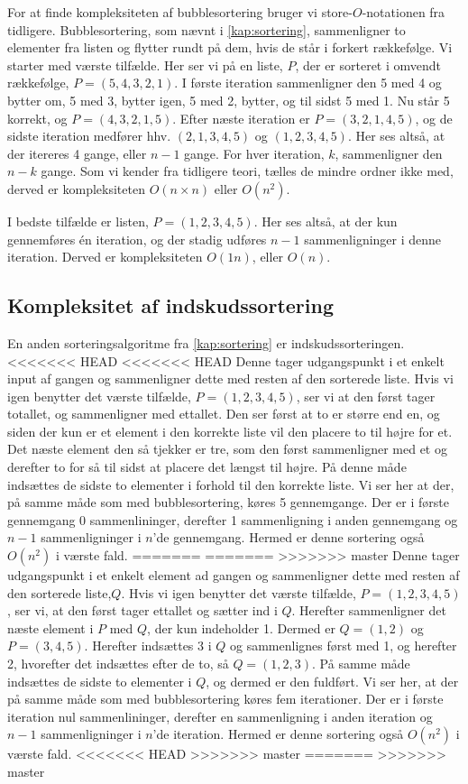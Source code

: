For at finde kompleksiteten af bubblesortering bruger vi store-$O$-notationen fra tidligere. 
Bubblesortering, som nævnt i \autoref{kap:sortering}, sammenligner to elementer fra listen og flytter rundt på dem, hvis de står i forkert rækkefølge.
Vi starter med værste tilfælde. Her ser vi på en liste, $P$, der er sorteret i omvendt rækkefølge, $P = (5,4,3,2,1)$.
I første iteration sammenligner den 5 med 4 og bytter om, 5 med 3, bytter igen, 5 med 2, bytter, og til sidst 5 med 1. Nu står 5 korrekt, og $P = (4, 3, 2, 1, 5)$.
Efter næste iteration er $P = (3, 2, 1, 4, 5)$, og de sidste iteration medfører hhv. $(2, 1, 3, 4, 5)$ og $(1, 2, 3, 4, 5)$. Her ses altså, at der itereres 4 gange, eller $n-1$ gange. 
For hver iteration, $k$, sammenligner den $n-k$ gange. 
Som vi kender fra tidligere teori, tælles de mindre ordner ikke med, derved er kompleksiteten $O(n\times n)$ eller $O(n^2)$.

I bedste tilfælde er listen, $P = (1, 2, 3, 4, 5)$.
Her ses altså, at der kun gennemføres én iteration, og der stadig udføres $n-1$ sammenligninger i denne iteration. Derved er kompleksiteten $O(1n)$, eller $O(n)$. 

\subsection{Kompleksitet af indskudssortering} \label{kap:kom_indskud}
En anden sorteringsalgoritme fra \autoref{kap:sortering} er indskudssorteringen. 
<<<<<<< HEAD
<<<<<<< HEAD
Denne tager udgangspunkt i et enkelt input af gangen og sammenligner dette med resten af den sorterede liste.
Hvis vi igen benytter det værste tilfælde, $P = (1,2,3,4,5)$, ser vi at den først tager totallet, og sammenligner med ettallet. Den ser først at to er større end en, og siden der kun er et element i den korrekte liste vil den placere to til højre for et. Det næste element den så tjekker er tre, som den først sammenligner med et og derefter to for så til sidst at placere det længst til højre. På denne måde indsættes de sidste to elementer i forhold til den korrekte liste.
Vi ser her at der, på samme måde som med bubblesortering, køres 5 gennemgange. Der er i første gennemgang 0 sammenlininger, derefter 1 sammenligning i anden gennemgang og $n-1$ sammenligninger i $n$'de gennemgang. Hermed er denne sortering også $O(n^2)$ i værste fald.
=======
=======
>>>>>>> master
Denne tager udgangspunkt i et enkelt element ad gangen og sammenligner dette med resten af den sorterede liste,$Q$.
Hvis vi igen benytter det værste tilfælde, $P = (1,2,3,4,5)$, ser vi, at den først tager ettallet og sætter ind i $Q$. Herefter sammenligner det næste element i $P$ med $Q$, der kun indeholder 1. Dermed er $Q=(1,2)$ og $P=(3,4,5)$. 
Herefter indsættes 3 i $Q$ og sammenlignes først med 1, og herefter 2, hvorefter det indsættes efter de to, så $Q = (1,2,3)$. På samme måde indsættes de sidste to elementer i $Q$, og dermed er den fuldført.
Vi ser her, at der på samme måde som med bubblesortering køres fem iterationer. Der er i første iteration nul sammenlininger, derefter en sammenligning i anden iteration og $n-1$ sammenligninger i $n$'de iteration. Hermed er denne sortering også $O(n^2)$ i værste fald.
<<<<<<< HEAD
>>>>>>> master
=======
>>>>>>> master


